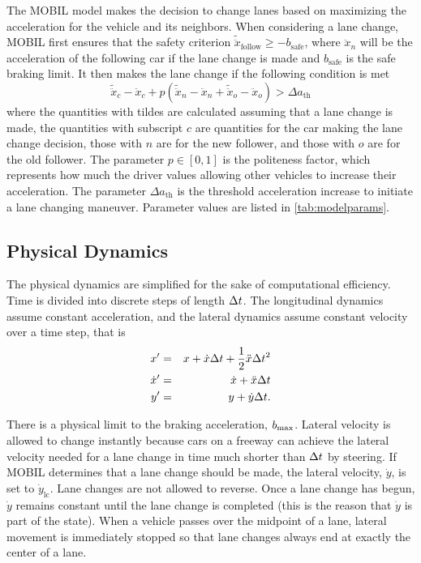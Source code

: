 The MOBIL model makes the decision to change lanes based on maximizing the acceleration for the vehicle and its neighbors.
When considering a lane change, MOBIL first ensures that the safety criterion $\tilde{\ddot{x}}_\text{follow} \geq -b_\text{safe}$, where $\ddot{x}_n$ will be the acceleration of the following car if the lane change is made and $b_\text{safe}$ is the safe braking limit. 
It then makes the lane change if the following condition is met
\begin{equation}
    \tilde{\ddot{x}}_c - \ddot{x}_c + p \left( \tilde{\ddot{x}}_n - \ddot{x}_n + \tilde{\ddot{x}}_o - \ddot{x}_o \right) > \Delta a_\text{th}
\end{equation}
where the quantities with tildes are calculated assuming that a lane change is made, the quantities with subscript $c$ are quantities for the car making the lane change decision, those with $n$ are for the new follower, and those with $o$ are for the old follower.
The parameter $p \in [0,1]$ is the politeness factor, which represents how much the driver values allowing other vehicles to increase their acceleration. The parameter $\Delta a_\text{th}$ is the threshold acceleration increase to initiate a lane changing maneuver. Parameter values are listed in \cref{tab:modelparams}.


\subsection{Physical Dynamics} \label{sec:dynamics}

The physical dynamics are simplified for the sake of computational efficiency. Time is divided into discrete steps of length $\Delta t$.
The longitudinal dynamics assume constant acceleration, and the lateral dynamics assume constant velocity over a time step, that is
\begin{eqnarray*}
    x'&=&x + \dot{x} \Delta t + \frac{1}{2} \ddot{x} \Delta t^2 \\
    \dot{x}'&=&\dot{x} + \ddot{x} \Delta t \\
    y'&=&y + \dot{y} \Delta t \text{.}
\end{eqnarray*}

There is a physical limit to the braking acceleration, $b_\text{max}$.
Lateral velocity is allowed to change instantly because cars on a freeway can achieve the lateral velocity needed for a lane change in time much shorter than $\Delta t$ by steering.
If MOBIL determines that a lane change should be made, the lateral velocity, $\dot{y}$, is set to $\dot{y}_\text{lc}$.
Lane changes are not allowed to reverse. Once a lane change has begun, $\dot{y}$ remains constant until the lane change is completed (this is the reason that $\dot{y}$ is part of the state).
When a vehicle passes over the midpoint of a lane, lateral movement is immediately stopped so that lane changes always end at exactly the center of a lane.

